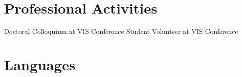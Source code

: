 \documentclass[11pt,a4paper,sans]{moderncv} %
\begin{document}





\section{Professional Activities}

 {Doctoral Colloquium at VIS Conference}
 {Student Volunteer at VIS Conference}



\section{Languages}







\clearpage
\end{document}
